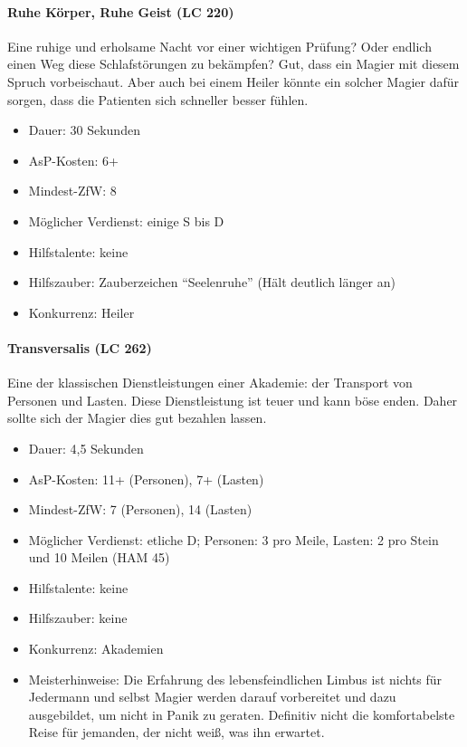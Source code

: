 \paragraph{Ruhe Körper, Ruhe Geist (LC 220)}
Eine ruhige und erholsame Nacht vor einer wichtigen Prüfung? Oder endlich einen Weg diese Schlafstörungen zu bekämpfen? Gut, dass ein Magier mit diesem Spruch vorbeischaut. Aber auch bei einem Heiler könnte ein solcher Magier dafür sorgen, dass die Patienten sich schneller besser fühlen.
\begin{itemize}
	\item Dauer: 30 Sekunden
	\item AsP-Kosten: 6+
	\item Mindest-ZfW: 8
	\item Möglicher Verdienst: einige S bis D
	\item Hilfstalente: keine
	\item Hilfszauber: Zauberzeichen \enquote{Seelenruhe} (Hält deutlich länger an)
	\item Konkurrenz: Heiler
\end{itemize}

\paragraph{Transversalis (LC 262)}
Eine der klassischen Dienstleistungen einer Akademie: der Transport von Personen und Lasten. Diese Dienstleistung ist teuer und kann böse enden. Daher sollte sich der Magier dies gut bezahlen lassen.
\begin{itemize}
	\item Dauer: 4,5 Sekunden
	\item AsP-Kosten: 11+ (Personen), 7+ (Lasten)
	\item Mindest-ZfW: 7 (Personen), 14 (Lasten)
	\item Möglicher Verdienst: etliche D; Personen: \SI{3}{\D} pro Meile, Lasten: \SI{2}{\D} pro Stein und 10 Meilen (HAM 45)
	\item Hilfstalente: keine
	\item Hilfszauber: keine
	\item Konkurrenz: Akademien
	\item Meisterhinweise: Die Erfahrung des lebensfeindlichen Limbus ist nichts für Jedermann und selbst Magier werden darauf vorbereitet und dazu ausgebildet, um nicht in Panik zu geraten. Definitiv nicht die komfortabelste Reise für jemanden, der nicht weiß, was ihn erwartet.
\end{itemize}

